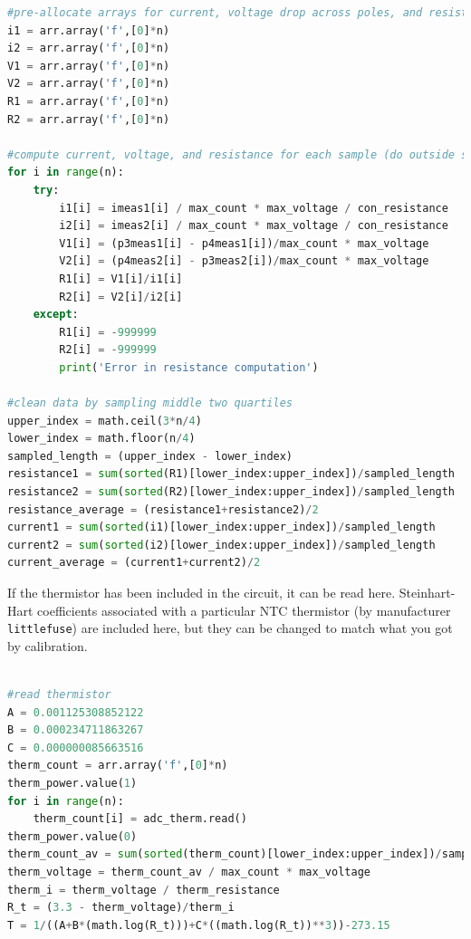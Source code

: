 \begin{lstlisting}[language=Python]
#pre-allocate arrays for current, voltage drop across poles, and resistance, for flow each direction
i1 = arr.array('f',[0]*n)
i2 = arr.array('f',[0]*n)
V1 = arr.array('f',[0]*n)
V2 = arr.array('f',[0]*n)
R1 = arr.array('f',[0]*n)
R2 = arr.array('f',[0]*n)

#compute current, voltage, and resistance for each sample (do outside sampling loop to maintain sampling timing)
for i in range(n):
    try:
        i1[i] = imeas1[i] / max_count * max_voltage / con_resistance 
        i2[i] = imeas2[i] / max_count * max_voltage / con_resistance 
        V1[i] = (p3meas1[i] - p4meas1[i])/max_count * max_voltage
        V2[i] = (p4meas2[i] - p3meas2[i])/max_count * max_voltage
        R1[i] = V1[i]/i1[i]
        R2[i] = V2[i]/i2[i]
    except:
        R1[i] = -999999
        R2[i] = -999999
        print('Error in resistance computation')

#clean data by sampling middle two quartiles       
upper_index = math.ceil(3*n/4)
lower_index = math.floor(n/4)
sampled_length = (upper_index - lower_index)
resistance1 = sum(sorted(R1)[lower_index:upper_index])/sampled_length
resistance2 = sum(sorted(R2)[lower_index:upper_index])/sampled_length
resistance_average = (resistance1+resistance2)/2
current1 = sum(sorted(i1)[lower_index:upper_index])/sampled_length
current2 = sum(sorted(i2)[lower_index:upper_index])/sampled_length
current_average = (current1+current2)/2

\end{lstlisting}

If the thermistor has been included in the circuit, it can be read here.  Steinhart-Hart coefficients associated with a particular NTC thermistor (by manufacturer \texttt{littlefuse}) are included here, but they can be changed to match what you got by calibration.

\begin{lstlisting}[language=Python]

#read thermistor
A = 0.001125308852122
B = 0.000234711863267
C = 0.000000085663516
therm_count = arr.array('f',[0]*n)
therm_power.value(1)
for i in range(n):
    therm_count[i] = adc_therm.read()
therm_power.value(0)
therm_count_av = sum(sorted(therm_count)[lower_index:upper_index])/sampled_length    
therm_voltage = therm_count_av / max_count * max_voltage
therm_i = therm_voltage / therm_resistance
R_t = (3.3 - therm_voltage)/therm_i
T = 1/((A+B*(math.log(R_t)))+C*((math.log(R_t))**3))-273.15

\end{lstlisting}

